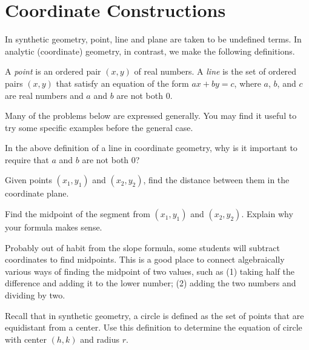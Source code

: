 \newpage
\section{Coordinate Constructions}
In synthetic geometry, point, line and plane are taken to be undefined terms.  In analytic (coordinate) geometry, in contrast, we make the following definitions.  
\begin{definition}
A \emph{point} is an ordered pair $(x,y)$ of real numbers. A \emph{line} is the set of ordered pairs $(x,y)$ that satisfy an equation of the form $ax + by = c$, where $a$, $b$, and $c$ are real numbers and $a$ and $b$ are not both 0.   
\end{definition}

Many of the problems below are expressed generally.  You may find it useful to try some specific examples before the general case.  


\begin{prob}
In the above definition of a line in coordinate geometry, why is it important to require that $a$ and $b$ are not both 0?  
\end{prob}

\begin{prob}
Given points $(x_1, y_1)$ and $(x_2, y_2)$, find the distance between them in the coordinate plane.
\end{prob}

\begin{prob}
Find the midpoint of the segment from $(x_1, y_1)$ and $(x_2, y_2)$.  Explain why your formula makes sense. 
\end{prob}

\begin{teachingnote}
Probably out of habit from the slope formula, some students will subtract coordinates to find midpoints.  This is a good place to connect algebraically various ways of finding the midpoint of two values, such as (1) taking half the difference and adding it to the lower number; (2) adding the two numbers and dividing by two. 
\end{teachingnote}   

\begin{prob}
Recall that in synthetic geometry, a circle is defined as the set of points that are equidistant from a center.  Use this definition to determine the equation of circle with center $(h, k)$ and radius $r$.  
\end{prob}


